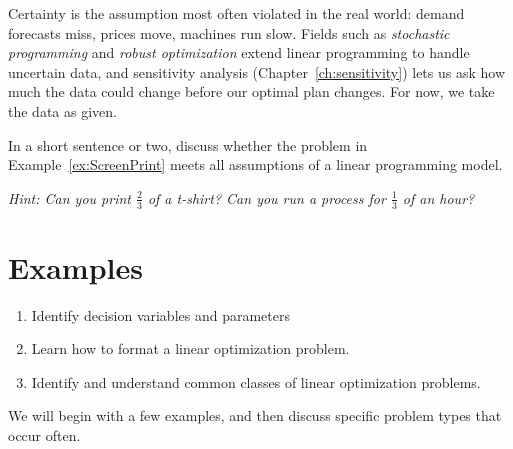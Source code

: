 Certainty is the assumption most often violated in the real world: demand forecasts miss, prices move, machines run slow.  Fields such as \emph{stochastic programming} and \emph{robust optimization} extend linear programming to handle uncertain data, and sensitivity analysis (Chapter~\ref{ch:sensitivity}) lets us ask how much the data could change before our optimal plan changes.  For now, we take the data as given.

\begin{learningcheckpoint}[label={lc:lp-assumptions}]
In a short sentence or two, discuss whether the problem in
Example~\ref{ex:ScreenPrint} meets all assumptions of a linear programming model.

\emph{Hint: Can you print $\tfrac{2}{3}$ of a t-shirt? Can you run a process
for $\tfrac{1}{3}$ of an hour?}
\end{learningcheckpoint}

\section{Examples}
\label{sec:lp-examples}

\begin{outcome}

\begin{enumerate}
\item Identify decision variables and parameters
\item Learn how to format a linear optimization problem.
\item Identify and understand common classes of linear optimization problems.
\end{enumerate}
\end{outcome}

We will begin with a few examples, and then discuss specific problem types that occur often.

